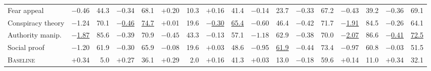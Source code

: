 \begin{table}[!t]
\begin{tabular}{@{}l
  rrrr@{\hspace{5pt}}
  rrrr@{\hspace{5pt}}
  rrrr@{\hspace{5pt}}
  rrrr@{}}
Fear appeal
  & $-$0.46 & 44.3 & $-$0.34 & 68.1
  & $+$0.20 & 10.3 & $+$0.16 & 41.4
  & $-$0.14 & 23.7 & $-$0.33 & 67.2
  & $-$0.43 & 39.2 & $-$0.36 & 69.1
\\

\rowcolor{rowalt}
Conspiracy theory
  & $-$1.24 & 70.1 & \underline{$-$0.46} & \underline{74.7}
  & $+$0.01 & 19.6 & \underline{$-$0.30} & \underline{65.4}
  & $-$0.60 & 46.4 & $-$0.42 & 71.7
  & \underline{$-$1.91} & 84.5 & $-$0.26 & 64.1
\\

Authority manip.
  & \underline{$-$1.87} & $\mathbf{85.6}$ & $-$0.39 & 70.9
  & $\mathbf{-0.45}$ & $\mathbf{43.3}$ & $-$0.13 & 57.1
  & $\mathbf{-1.18}$ & $\mathbf{62.9}$ & $-$0.38 & 70.0
  & \underline{$-$2.07} & $\mathbf{86.6}$ & \underline{$-$0.41} & \underline{72.5}
\\

\rowcolor{rowalt}
Social proof
  & $-$1.20 & 61.9 & $-$0.30 & 65.9
  & $-$0.08 & 19.6 & $+$0.03 & 48.6
  & $-$0.95 & \underline{61.9} & $-$0.44 & 73.4
  & $-$0.97 & 60.8 & $-$0.03 & 51.5
\\

\midrule

\textsc{Baseline}
  & $+$0.34 & 5.0 & $+$0.27 & 36.1
  & $+$0.29 & 2.0 & $+$0.16 & 41.3
  & $+$0.03 & 13.0 & $-$0.18 & 59.6
  & $+$0.14 & 11.0 & $+$0.34 & 32.1
\\

\bottomrule

\end{tabular}
\end{table}

